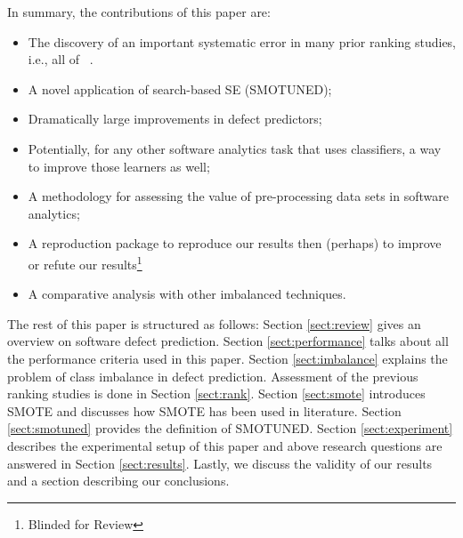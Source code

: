 \documentclass[sigconf,review, anonymous]{acmart}
\newcommand{\bi}{\begin{itemize}[leftmargin=0.4cm]}
\newcommand{\ei}{\end{itemize}}
\theoremstyle{break}
\theoremstyle{break}
\newcommand{\tion}[1]{{Section }\ref{sect:#1}}
\newcommand{\sma}{{\sc SMOTE}}
\newcommand{\smb}{{\sc SMOTUNED}}
\begin{document}
\noindent
In summary, the  contributions of this paper are:
\bi
\item The discovery of an important systematic error in  many prior ranking studies, i.e., all of
~\cite{lessmann2008benchmarking,hall2012systematic,elish2008predicting,menzies2010defect,gondra2008applying,radjenovic2013software,jiang2008techniques,wang2013using,mende2009revisiting,li2012sample,khoshgoftaar2010attribute,jiang2009variance,ghotra2015revisiting,jiang2008can,tantithamthavorn2016automated,fu2016tuning}.
\item A novel application of search-based SE ({\smb});
\item Dramatically large improvements in  defect predictors;
\item Potentially, for any other software analytics task that uses classifiers, a way to improve those learners as well;
\item A methodology for assessing the value of pre-processing data sets in software analytics;
\item A reproduction package to reproduce our results then (perhaps) to improve or refute  our results\footnote{Blinded for Review}
\item A comparative analysis with other imbalanced techniques.
\ei
The rest of this paper is structured as follows:
\tion{review} gives an overview on software defect prediction.
\tion{performance} talks about all the performance criteria used in this paper.
\tion{imbalance} explains the problem of class imbalance in defect prediction. Assessment of the previous ranking studies is done in \tion{rank}.
\tion{smote} introduces {\sma} and discusses how {\sma} has been used in literature. \tion{smotuned} provides the definition of {\smb}. \tion{experiment} describes the experimental setup of this paper and above research questions are answered in
\tion{results}. Lastly, we discuss the validity of our results 
and a section describing our conclusions.
 


 

\end{document}
